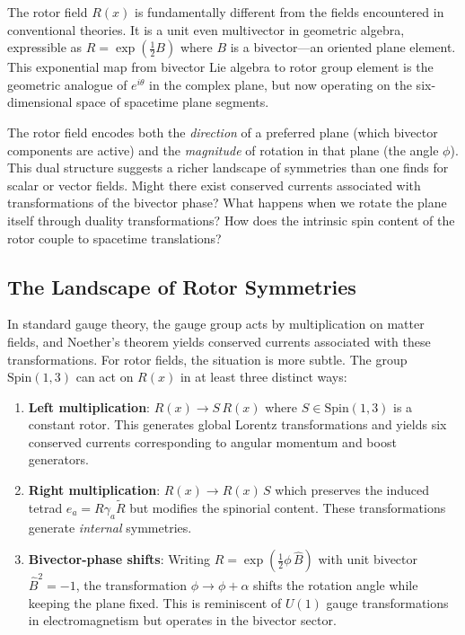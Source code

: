 \documentclass[11pt,a4paper]{article}
\numberwithin{equation}{section}
\theoremstyle{plain}
\theoremstyle{definition}
\theoremstyle{remark}
\begin{document}
The rotor field $R(x)$ is fundamentally different from the fields encountered in conventional theories. It is a unit even multivector in geometric algebra, expressible as $R=\exp(\frac{1}{2}B)$ where $B$ is a bivector---an oriented plane element. This exponential map from bivector Lie algebra to rotor group element is the geometric analogue of $e^{i\theta}$ in the complex plane, but now operating on the six-dimensional space of spacetime plane segments.

The rotor field encodes both the \emph{direction} of a preferred plane (which bivector components are active) and the \emph{magnitude} of rotation in that plane (the angle $\phi$). This dual structure suggests a richer landscape of symmetries than one finds for scalar or vector fields. Might there exist conserved currents associated with transformations of the bivector phase? What happens when we rotate the plane itself through duality transformations? How does the intrinsic spin content of the rotor couple to spacetime translations?

\subsection{The Landscape of Rotor Symmetries}

In standard gauge theory, the gauge group acts by multiplication on matter fields, and Noether's theorem yields conserved currents associated with these transformations. For rotor fields, the situation is more subtle. The group $\mathrm{Spin}(1,3)$ can act on $R(x)$ in at least three distinct ways:

\begin{enumerate}
  \item \textbf{Left multiplication}: $R(x) \to S \, R(x)$ where $S \in \mathrm{Spin}(1,3)$ is a constant rotor. This generates global Lorentz transformations and yields six conserved currents corresponding to angular momentum and boost generators.

  \item \textbf{Right multiplication}: $R(x) \to R(x) \, S$ which preserves the induced tetrad $e_a = R\gamma_a\widetilde{R}$ but modifies the spinorial content. These transformations generate \emph{internal} symmetries.

  \item \textbf{Bivector-phase shifts}: Writing $R=\exp(\frac{1}{2}\phi\,\hat{B})$ with unit bivector $\hat{B}^2=-1$, the transformation $\phi \to \phi + \alpha$ shifts the rotation angle while keeping the plane fixed. This is reminiscent of $U(1)$ gauge transformations in electromagnetism but operates in the bivector sector.
\end{enumerate}
\end{document}
